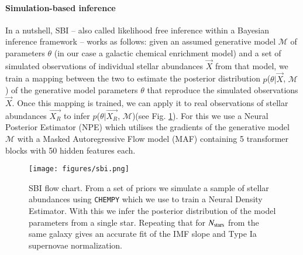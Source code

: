 \documentclass{aa}
\begin{document}
\paragraph{Simulation-based inference}
In a nutshell, SBI \citep[e.g.][]{Cranmer2020,Papamakarios:2021,Gloeckler2024AllinoneSI} -- also called likelihood free inference within a  Bayesian inference framework --  works as follows: given an assumed generative model $\mathcal{M}$ of parameters $\theta$ (in our case a galactic chemical enrichment model) and a set of simulated observations of individual stellar abundances $\Vec{X}$ from that model, we train a mapping between the two to estimate the posterior distribution $p$($\theta|\Vec{X}$, $\mathcal{M}$) of the generative model parameters $\theta$ that reproduce the simulated observations $\Vec{X}$. Once this mapping is trained, we can apply it to real observations of stellar abundances $\Vec{X_R}$ to infer $p$($\theta|\Vec{X_R}$, $\mathcal{M}$)(see Fig. \ref{fig:flowchart}).
For this we use a Neural Posterior Estimator (NPE) \cite{zeghal2022neuralposteriorestimationdifferentiable} which utilises the gradients of the generative model $\mathcal{M}$ with a Masked Autoregressive Flow model (MAF) \cite{papamakarios2018maskedautoregressiveflowdensity} containing 5 transformer blocks with 50 hidden features each.

\begin{figure}[]
    \centering
    \vspace{-.25cm}
    \texttt{[image: figures/sbi.png]}
    \vspace{-.7cm}
    \caption{SBI flow chart. From a set of priors we simulate a sample of stellar abundances using \texttt{CHEMPY} which we use to train a Neural Density Estimator. With this we infer the posterior distribution of the model parameters from a single star. Repeating that for $N_{\rm stars}$ from the same galaxy gives an accurate fit of the IMF slope and Type Ia supernovae normalization.}
    \label{fig:flowchart}
\end{figure}
\end{document}
